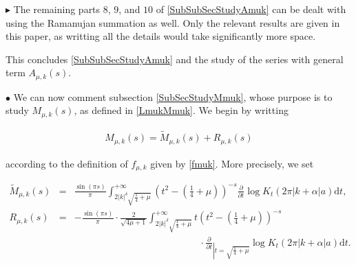 \documentclass{jams-l}
\theoremstyle{definition}
\theoremstyle{remark}
\numberwithin{equation}{section}
\begin{document}
                
                \medskip
                
                \hspace{30pt} $\blacktriangleright$ The remaining parts $8$, $9$, and $10$ of \ref{SubSubSecStudyAmuk} can be dealt with using the Ramanujan summation as well. Only the relevant results are given in this paper, as writting all the details would take significantly more space.
                
                
                \medskip
                
                This concludes \ref{SubSubSecStudyAmuk} and the study of the series with general term $A_{\mu,k} \left( s \right)$.
                
                
        
        \medskip
        
        \hspace{10pt} $\bullet$ We can now comment subsection \ref{SubSecStudyMmuk}, whose purpose is to study $M_{\mu,k} \left( s \right)$, as defined in \eqref{LmukMmuk}. We begin by writting 
        
            \[ \begin{array}{lll}
                    M_{\mu,k} \left( s \right) = \widetilde{M}_{\mu,k} \left( s \right) + R_{\mu,k} \left( s \right)
                \end{array} \]
            
            \noindent according to the definition of $f_{\mu,k}$ given by \eqref{fmuk}. More precisely, we set
        
            \[ \begin{array}{lll}
                    \widetilde{M}_{\mu,k} \left( s \right) & = & \frac{\sin \left( \pi s \right)}{\pi} \int_{2 \left \vert k \right \vert^{\delta} \sqrt{\frac{1}{4} + \mu}}^{+ \infty} \left( t^2 - \left( \frac{1}{4} + \mu \right) \right)^{-s} \frac{\partial}{\partial t} \log K_t \left( 2\pi \left \vert k + \alpha \right \vert a \right) \mathrm{d}t, \\[1.5em]
                    
                    R_{\mu,k} \left( s \right) & = & - \frac{\sin \left( \pi s \right)}{\pi} \cdot \frac{2}{\sqrt{4 \mu + 1}} \int_{2 \left \vert k \right \vert^{\delta} \sqrt{\frac{1}{4} + \mu}}^{+ \infty} t \left( t^2 - \left( \frac{1}{4} + \mu \right) \right)^{-s} \\[0.8em]
                    
                    && \qquad \qquad \qquad \qquad \qquad \qquad \quad \cdot \frac{\partial}{\partial t}_{\left \vert t = \sqrt{\frac{1}{4} + \mu} \right.} \log K_t \left( 2 \pi \left \vert k + \alpha \right \vert a \right) \mathrm{d}t.
                \end{array} \]
            
\end{document}
